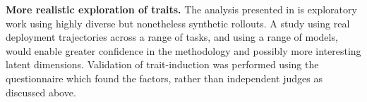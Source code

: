 
\textbf{More realistic exploration of traits.} The analysis presented in  is exploratory work using highly diverse but nonetheless synthetic rollouts. A study using real deployment trajectories across a range of tasks, and using a range of models, would enable greater confidence in the methodology and possibly more interesting latent dimensions. Validation of trait-induction was performed using the questionnaire which found the factors, rather than independent judges as discussed above.




% 
